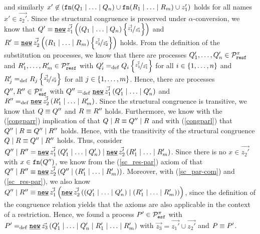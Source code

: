 \begin{prf}
\begin{description}
\begin{description}
and similarly $x'\not\in\left(\mathtt{fn}(Q_1 \mid \ldots \mid Q_n)\cup\mathtt{fn}(R_1 \mid \ldots \mid R_m)\cup{}z_1'\right)$ holds for all names $x'\in\vec{z_2'}$. Since the structural congruence is preserved under $\alpha$-conversion, we know that $Q'\struct{}\procres[()]{\vec{z_1'}}{\left(\procpar{Q_1}{\procpar{\ldots}{Q_n}}\right)\subs{\vec{z_1'}}{\vec{z_1}}}$ and $R'\struct{}\procres[()]{\vec{z_2'}}{\left(\procpar{R_1}{\procpar{\ldots}{R_m}}\right)\subs{\vec{z_2'}}{\vec{z_2}}}$ holds. From the definition of the substitution on processes, we know that there are processes $Q_1',\ldots,Q_n'\in\mathcal P^{\pi}_{\mathtt{resf}}$ and $R_1',\ldots,R_m'\in\mathcal P^{\pi}_{\mathtt{resf}}$ with $Q_i'=_{\mathrm{def}}{}Q_i\left\{\nicefrac{\vec{z_1'}}{\vec{z_1}}\right\}$ for all $i\in\set{1,\ldots,n}$ and $R_j'=_{\mathrm{def}}{}R_j\left\{\nicefrac{\vec{z_2'}}{\vec{z_2}}\right\}$ for all $j\in\set{1,\ldots,m}$. Hence, there are processes $Q'',R''\in\mathcal P^{\pi}_{\mathtt{esf}}$ with $Q''\define{}\procres[()]{\vec{z_1'}}{\procpar{Q_1'}{\procpar{\ldots}{Q_n'}}}$ and $R''\define{}\procres[()]{\vec{z_2'}}{\procpar{R_1'}{\procpar{\ldots}{R_m'}}}$. Since the structural congruence is transitive, we know that $Q\equiv{}{}Q''$ and $R\equiv{}{}R''$ holds. Furthermore, we know with the (\ref{congparr}) implication of  that $Q \mid R\equiv{}{}Q'' \mid R$ and with (\ref{congparl}) that $Q'' \mid R\equiv{}{}Q'' \mid R''$ holds. Hence, with the transitivity of the structural congruence $Q \mid R\equiv{}{}Q'' \mid R''$ holds. Thus, consider $\procpar{Q''}{R''}=\procpar{\procres[()]{\vec{z_1'}}{\procpar{Q_1'}{\procpar{\ldots}{Q_n'}}}}{\procres[()]{\vec{z_2'}}{\procpar{R_1'}{\procpar{\ldots}{R_m'}}}}$. Since there is no $x\in\vec{z_2'}$ with $x\in\mathtt{fn}(Q'')$, we know from the (\ref{sc_res-par}) axiom of  that $\procpar{Q''}{R''}\struct{}\procres[()]{\vec{z_2'}}{\procpar{Q''}{\left(\procpar{R_1'}{\procpar{\ldots}{R_m'}}\right)}}$. Moreover, with (\ref{sc_par-com}) and (\ref{sc_res-par}), we also know $\procpar{Q''}{R''}\struct{}\procres[()]{\vec{z_1'}}{\procres[()]{\vec{z_2'}}{\procpar{\left(\procpar{Q_1'}{\procpar{\ldots}{Q_n'}}\right)}{\left(\procpar{R_1'}{\procpar{\ldots}{R_m'}}\right)}}}$, since the definition of the congruence relation yields that the axioms are also applicable in the context of a restriction. Hence, we found a process $P'\in\mathcal P^{\pi}_{\mathtt{esf}}$ with $P'\define{}\procres[()]{\vec{z_3}}{\procpar{\procpar{Q_1'}{\procpar{\ldots}{Q_n'}}}{\procpar{R_1'}{\procpar{\ldots}{R_m'}}}}$ with $\vec{z_3}=\vec{z_1'}\cup\vec{z_2'}$ and $P\equiv{}{}P'$.
	

\end{description}
\end{description}
\end{prf}
